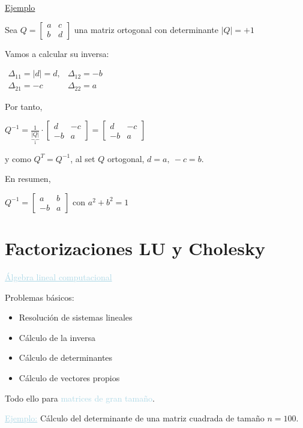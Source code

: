 \documentclass[12pt]{article}
\begin{document}
\underline{Ejemplo}

Sea $Q=\begin{bmatrix}
a & c \\ 
b & d
\end{bmatrix} $ una matriz ortogonal con determinante $|Q|=+1$

Vamos a calcular su inversa:

$\begin{array}{ll}
\Delta_{11}=|d|=d, & \Delta_{12}=-b\\
\Delta_{21}=-c & \Delta_{22}=a
\end{array}$

Por tanto,

$Q^{-1}=\frac{1}{\underbrace{|Q|}_{1}} \cdot\begin{bmatrix}
d & -c \\ 
-b & a
\end{bmatrix}=\begin{bmatrix}
d & -c \\ 
-b & a
\end{bmatrix}$

y como $Q^T=Q^{-1}$, al set $Q$ ortogonal, $d=a,~-c=b$.

En resumen, 

$Q^{-1}=\begin{bmatrix}
a & b \\ 
-b & a
\end{bmatrix}$ con $a^2+b^2=1$

\newpage

\section{Factorizaciones LU y Cholesky}

\textcolor{lightblue}{\underline{Álgebra lineal computacional}}

Problemas básicos:

\begin{itemize}
\item Resolución de sistemas lineales
\item Cálculo de la inversa
\item Cálculo de determinantes
\item Cálculo de vectores propios
\end{itemize}
Todo ello para \textcolor{lightblue}{matrices de gran tamaño}.

\textcolor{lightblue}{\underline{Ejemplo:}} Cálculo del
determinante de una matriz cuadrada de tamaño $n=100$.
\end{document}
